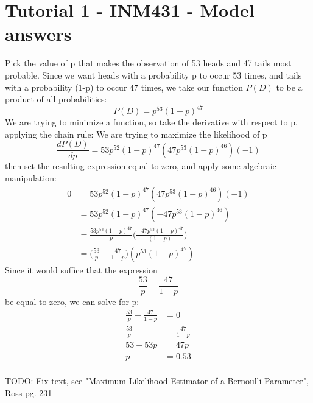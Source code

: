 \documentclass{article}
\begin{document}
\section*{Tutorial 1 - INM431 - Model answers}
Pick the value of p that makes the observation of 53 heads and 47 tails most probable.   
Since we want heads with a probability p to occur 53 times, and tails with a probability (1-p) to occur 47 times, we take our function $P(D)$  to be a product of all probabilities:
\begin{equation}
    P(D) = p^{53}(1-p)^{47}
\end{equation}
We are trying to minimize a function, so take the derivative with respect to p, applying the chain rule:
We are trying to maximize the likelihood of p
$$
\frac{dP(D)}{dp}=53p^{52}(1-p)^{47}(47p^{53}(1-p)^{46})(-1)
$$
then set the resulting expression equal to zero, and apply some algebraic manipulation:
\begin{align*}
0 & = 53p^{52}(1-p)^{47}(47p^{53}(1-p)^{46})(-1)  \\
& = 53p^{52}(1-p)^{47}(-47p^{53}(1-p)^{46}) \\
& = \frac{53p^{53}(1-p)^{47}}{p}\Bigg(\frac{-47p^{53}(1-p)^{47}}{(1-p)}\Bigg) \\
& = \Bigg(\frac{53}{p}-\frac{47}{1-p}\Bigg)(p^{53}(1-p)^{47})
\end{align*}
Since it would suffice that the expression
$$
\frac{53}{p}-\frac{47}{1-p}
$$
be equal to zero, we can solve for p:
\begin{align*}
\frac{53}{p}-\frac{47}{1-p} & = 0 \\
\frac{53}{p} & = \frac{47}{1-p} \\
53 - 53p & = 47p \\
p & = 0.53 \\
\end{align*}

TODO: Fix text, see "Maximum Likelihood Estimator of a Bernoulli Parameter", Ross pg. 231
\end{document}
